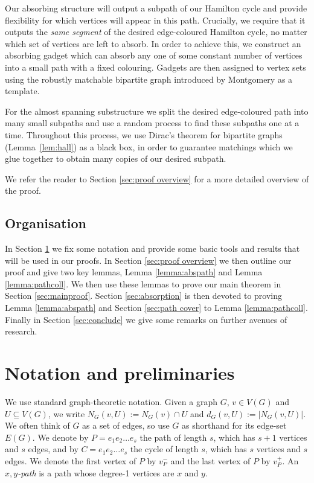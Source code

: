 \documentclass[11pt, dvipsnames]{amsart}
\theoremstyle{plain}
\theoremstyle{definition}
\begin{document}
Our  absorbing structure will output a subpath of our Hamilton cycle and provide flexibility for which vertices will appear in this path. Crucially, we require that it outputs the \emph{same segment} of the desired edge-coloured Hamilton cycle, no matter which set of vertices are left to absorb. In order to achieve this, we construct an absorbing gadget which can absorb any one of some constant number of vertices into a small path with a fixed colouring. Gadgets are then assigned to vertex sets using the robustly matchable bipartite graph introduced by Montgomery \cite{mont} as a template. 

For the almost spanning substructure we split the desired edge-coloured path into many small subpaths and use a random process to find these subpaths one at a time. Throughout this process, we use Dirac's theorem for bipartite graphs (Lemma~\ref{lem:hall}) as a black box, in order to guarantee matchings which we glue together  to obtain many copies of our desired subpath. 

We refer the reader to Section \ref{sec:proof overview} for a more detailed overview of the proof. 


\subsection{Organisation} In Section \ref{sec:notation} we fix some notation and provide some basic tools and results that will be used in our proofs. In Section \ref{sec:proof overview} we then outline our proof and give two key lemmas, Lemma \ref{lemma:abspath} and Lemma \ref{lemma:pathcoll}. We then use these lemmas to prove our main theorem in Section \ref{sec:mainproof}. Section \ref{sec:absorption} is then devoted to proving Lemma \ref{lemma:abspath} and Section \ref{sec:path cover} to Lemma \ref{lemma:pathcoll}. Finally in Section \ref{sec:conclude} we give some remarks on further avenues of research. 

\section{Notation and preliminaries}
\label{sec:notation}
We use standard graph-theoretic notation. Given a graph $G$, $v \in V(G)$ and $U \subseteq V(G)$, 
we write $N_G(v,U) := N_G(v) \cap U$ and $ d_G(v,U) := |N_G(v,U)|$.
We often think of $G$ as a set of edges, so use $G$ as shorthand for its edge-set $E(G)$.
We denote by $P=e_1e_2\ldots e_s$ the path of length $s$, which has $s+1$ vertices and $s$ edges,
and by $C=e_1e_2\ldots e_s$ the cycle of length $s$, which has $s$ vertices and $s$ edges.
We denote the first vertex of $P$ by $v_P^-$ and the last vertex of $P$ by $v_P^+$.
An \emph{$x,y$-path} is a path whose degree-1 vertices are $x$ and $y$. 
\end{document}
